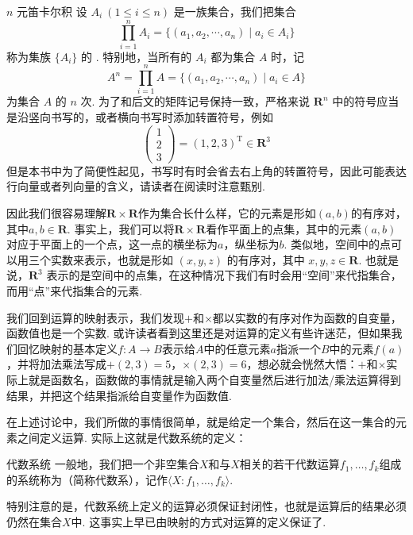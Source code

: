 \begin{definition}{$n$ 元笛卡尔积}{}
    设 $A_i~(1\leqslant i\leqslant n)$ 是一族集合，我们把集合
    \[
    \prod_{i=1}^n A_i = \{(a_1, a_2, \cdots, a_n) \mid a_i\in A_i\}
    \]
    称为集族 $\{A_i\}$ 的 . 特别地，当所有的 $A_i$ 都为集合 $A$ 时，记
    \[
    A^n = \prod_{i=1}^n A = \{(a_1, a_2, \cdots, a_n) \mid a_i \in A\}
    \]
    为集合 $A$ 的 $n$ 次. 为了和后文的矩阵记号保持一致，严格来说 $\mathbf{R}^n$ 中的符号应当是沿竖向书写的，或者横向书写时添加转置符号，例如
    \[
    \begin{pmatrix}
        1 \\ 2 \\ 3
    \end{pmatrix} = (1, 2, 3)^{\mathrm{T}} \in \mathbf{R}^3
    \]
    但是本书中为了简便性起见，书写时有时会省去右上角的转置符号，因此可能表达行向量或者列向量的含义，请读者在阅读时注意甄别.
\end{definition}

因此我们很容易理解$\mathbf{R}\times\mathbf{R}$作为集合长什么样，它的元素是形如$(a,b)$的有序对，其中$a,b\in\mathbf{R}$. 事实上，我们可以将$\mathbf{R}\times\mathbf{R}$看作平面上的点集，其中的元素$(a,b)$对应于平面上的一个点，这一点的横坐标为$a$，纵坐标为$b$. 类似地，空间中的点可以用三个实数来表示，也就是形如 $(x, y, z)$ 的有序对，其中 $x,y,z\in\mathbf{R}$. 也就是说，$\mathbf{R}^3$ 表示的是空间中的点集，在这种情况下我们有时会用``空间''来代指集合，而用``点''来代指集合的元素.

我们回到运算的映射表示，我们发现$+$和$\times$都以实数的有序对作为函数的自变量，函数值也是一个实数. 或许读者看到这里还是对运算的定义有些许迷茫，但如果我们回忆映射的基本定义$f\colon A\to B$表示给$A$中的任意元素$a$指派一个$B$中的元素$f(a)$，并将加法乘法写成$+(2,3)=5$，$\times(2,3)=6$，想必就会恍然大悟：$+$和$\times$实际上就是函数名，函数做的事情就是输入两个自变量然后进行加法/乘法运算得到结果，并把这个结果指派给自变量作为函数值.

在上述讨论中，我们所做的事情很简单，就是给定一个集合，然后在这一集合的元素之间定义运算. 实际上这就是代数系统的定义：
\begin{definition}{代数系统}{} 
    一般地，我们把一个非空集合$X$和与$X$相关的若干代数运算$f_1,\ldots,f_k$组成的系统称为（简称代数系），记作$\langle X \colon f_1,\ldots,f_k\rangle$.
\end{definition}

特别注意的是，代数系统上定义的运算必须保证封闭性，也就是运算后的结果必须仍然在集合$X$中. 这事实上早已由映射的方式对运算的定义保证了.

